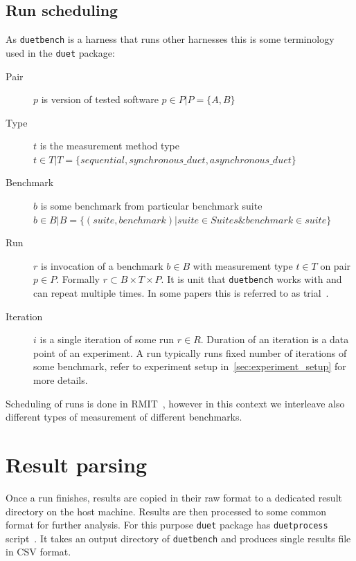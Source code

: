 \subsection{Run scheduling}

As \lstinline{duetbench} is a harness that runs other harnesses this is some terminology used in the \lstinline{duet} package:

\begin{description}
    \item[Pair] $p$ is version of tested software $p \in P | P = \{A, B\}$
    \item[Type] $t$ is the measurement method type
        $t \in T | T = \{sequential, synchronous\_duet, asynchronous\_duet\}$
    \item[Benchmark] $b$ is some benchmark from particular benchmark suite
        $b \in B | B = \{(suite, benchmark) | suite \in Suites \& benchmark \in suite\}$
    \item[Run] $r$ is invocation of a benchmark $b \in B$ with measurement type $t \in T$ on pair $p \in P$.
        Formally $r \subset B \times T \times P$. It is unit that \lstinline{duetbench} works with and can repeat multiple times. In some papers this is referred to as trial~\cite{laaber2019software}.
    \item[Iteration] $i$ is a single iteration of some run $r \in R$. Duration of an iteration is a data point of an experiment. A run typically runs fixed number of iterations of some benchmark, refer to experiment setup in~\cref{sec:experiment_setup} for more details.
\end{description}

Scheduling of runs is done in RMIT~\cite{abedi2017conducting}, however in this context we interleave also different types of measurement of different benchmarks.

\section{Result parsing}
\label{sec:result_parsing}

Once a run finishes, results are copied in their raw format to a dedicated result directory on the host machine.
Results are then processed to some common format for further analysis.
For this purpose \lstinline{duet} package has \lstinline{duetprocess} script~\cite{wiki}.
It takes an output directory of \lstinline{duetbench} and produces single results file in CSV format.


